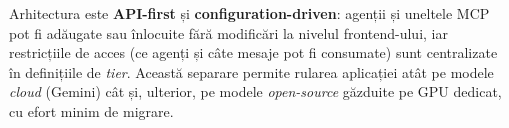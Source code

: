 Arhitectura este \textbf{API-first} și \textbf{configuration-driven}: agenții și uneltele MCP pot fi adăugate sau înlocuite fără modificări la nivelul frontend-ului, iar restricțiile de acces (ce agenți și câte mesaje pot fi consumate) sunt centralizate în definițiile de \textit{tier}. Această separare permite rularea aplicației atât pe modele \textit{cloud} (Gemini) cât și, ulterior, pe modele \textit{open-source} găzduite pe GPU dedicat, cu efort minim de migrare.
